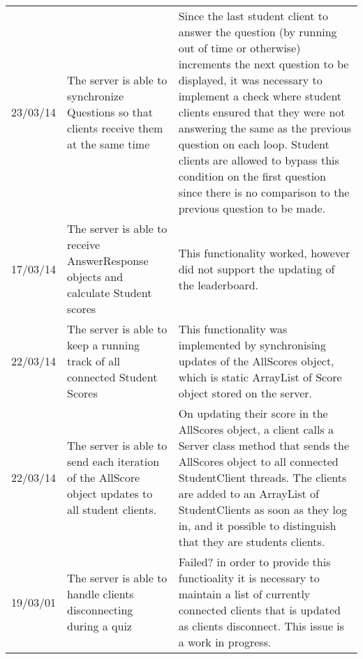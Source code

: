 \begin{longtabu}{l X X}
23/03/14	&The server is able to synchronize Questions so that clients receive them at the same time	&Since the last student client to answer the question (by running out of time or otherwise) increments the next question to be displayed, it was necessary to implement a check where student clients ensured that they were not answering the same as the previous question on each loop. Student clients are allowed to bypass this condition on the first question since there is no comparison to the previous question to be made.\\
17/03/14	&The server is able to receive AnswerResponse objects and calculate Student scores	&This functionality worked, however did not support the updating of the leaderboard.\\
22/03/14	&The server is able to keep a running track of all connected Student Scores	&This functionality was implemented by synchronising updates of the AllScores object, which is static ArrayList of Score object stored on the server. \\
22/03/14	&The server is able to send each iteration of the AllScore object updates to all student clients.	&On updating their score in the AllScores object, a client calls a Server class method that sends the AllScores object to all connected StudentClient threads. The clients are added to an ArrayList of StudentClients as soon as they log in, and it possible to distinguish that they are students clients.\\
19/03/01	&The server is able to handle clients disconnecting during a quiz	&Failed? in order to provide this functioality it is necessary to maintain a list of currently connected clients that is updated as clients disconnect. This issue is a work in progress.\\
	\bottomrule
\end{longtabu}
